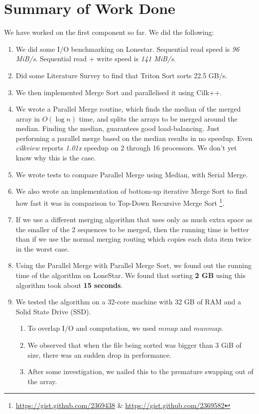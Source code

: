 \documentclass{article}
\begin{document}
\section{Summary of Work Done}
We have worked on the first component so far. We did the following:
\begin{enumerate}
\item We did some I/O benchmarking on Lonestar. Sequential read speed is \textit{96 MiB/s}. Sequential read + write speed is \textit{141 MiB/s}.
\item Did some Literature Survey to find that Triton Sort sorts 22.5 GB/s.
\item We then implemented Merge Sort and parallelised it using Cilk++.
\item We wrote a Parallel Merge routine, which finds the median of the merged array in $O(\log{n})$ time, and splits the arrays to be merged around the median. Finding the median, guarantees good load-balancing. Just performing a parallel merge based on the median results in no speedup. Even \textit{cilkview} reports \textit{1.01x} speedup on 2 through 16 processors. We don't yet know why this is the case.
\item We wrote tests to compare Parallel Merge using Median, with Serial Merge.
\item We also wrote an implementation of bottom-up iterative Merge Sort to find how fast it was in comparison to Top-Down Recursive Merge Sort \footnote{\url{https://gist.github.com/2369438} \& \url{https://gist.github.com/2369582}}.
\item If we use a different merging algorithm that uses only as much extra space as the smaller of the 2 sequences to be merged, then the running time is better than if we use the normal merging routing which copies each data item twice in the worst case.
\item Using the Parallel Merge with Parallel Merge Sort, we found out the running time of the algorithm on LoneStar. We found that sorting {\bf 2 GB} using this algorithm took about {\bf 15 seconds}.
\item We tested the algorithm on a 32-core machine with 32 GB of RAM and a Solid State Drive (SSD).
	\begin{enumerate}
	\item To overlap I/O and computation, we used $mmap$ and $munmap$. 
	\item We observed that when the file being sorted was bigger than 3 GiB of size, there was
	an sudden drop in performance.
	\item After some investigation, we nailed this to the premature swapping out of the array.

\end{enumerate}
\end{enumerate}
\end{document}
